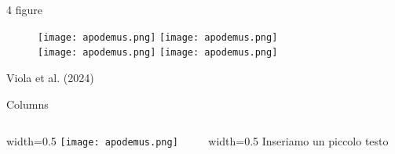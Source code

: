\documentclass{beamer}
\begin{document}
\begin{frame}{4 figure}
\begin{figure} %
    \centering %
    \texttt{[image: apodemus.png]} 
    \texttt{[image: apodemus.png]} \\ %
    \texttt{[image: apodemus.png]} 
    \texttt{[image: apodemus.png]} \\ %
\end{figure}

\bigskip %
\centering %
\scriptsize{Viola et al. (2024)} %
\end{frame}

\begin{frame}{Columns} 

    \begin{columns}
    \begin{column}{width=0.5\textwidth}
        \texttt{[image: apodemus.png]}       
    \end{column}
    \begin{column}{width=0.5\textwidth}
        Inseriamo un piccolo testo
    \end{column}
    \end{columns}
\end{frame}
\end{document}
